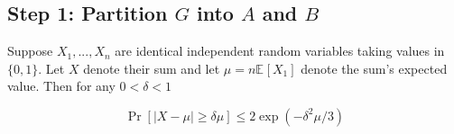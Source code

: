 \documentclass[11pt]{article}
\newcommand{\BipartiteG}{G_{A \cup A}}
\newcommand{\Mean}[2]{\mathbb{E}_{#1}\left[#2\right]}
\newcommand{\Prob}[1]{\Pr\left[#1 \right]}
\begin{document}
\subsection{Step 1: Partition $G$ into $A$ and $B$}

\begin{lemma}\label{lemma:mult-chernoff}
Suppose $X_1, ..., X_n$ are identical independent random variables taking values in $\{0, 1\}$. Let $X$ denote their sum and let $\mu = n\Mean{}{X_1}$ denote the sum's expected value. Then for any $0 < \delta < 1$

\[ \Prob{|X - \mu| \geq \delta \mu} \leq 2\exp(-\delta^2\mu/3)\]
	
\end{lemma}

\end{document}
